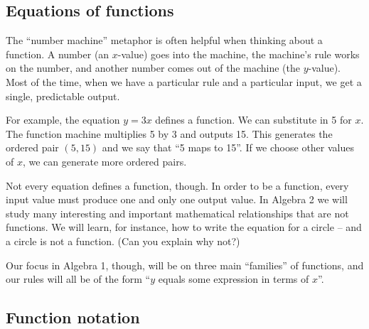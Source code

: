 

\subsection{Equations of functions}

The ``number machine'' metaphor is often helpful when thinking about a function. A number (an $x$-value) goes into the machine, the machine's rule works on the number, and another number comes out of the machine (the $y$-value). Most of the time, when we have a particular rule and a particular input, we get a single, predictable output.

For example, the equation $y = 3x$ defines a function. We can substitute in 5 for $x$. The function machine multiplies 5 by 3 and outputs 15. This generates the ordered pair $(5, 15)$ and we say that ``5 maps to 15''. If we choose other values of $x$, we can generate more ordered pairs.

Not every equation defines a function, though. In order to be a function, every input value must produce one and only one output value. In Algebra 2 we will study many interesting and important mathematical relationships that are not functions. We will learn, for instance, how to write the equation for a circle -- and a circle is not a function. (Can you explain why not?)

Our focus in Algebra 1, though, will be on three main ``families'' of functions, and our rules will all be of the form ``$y$ equals some expression in terms of $x$''.


\subsection{Function notation}

%

